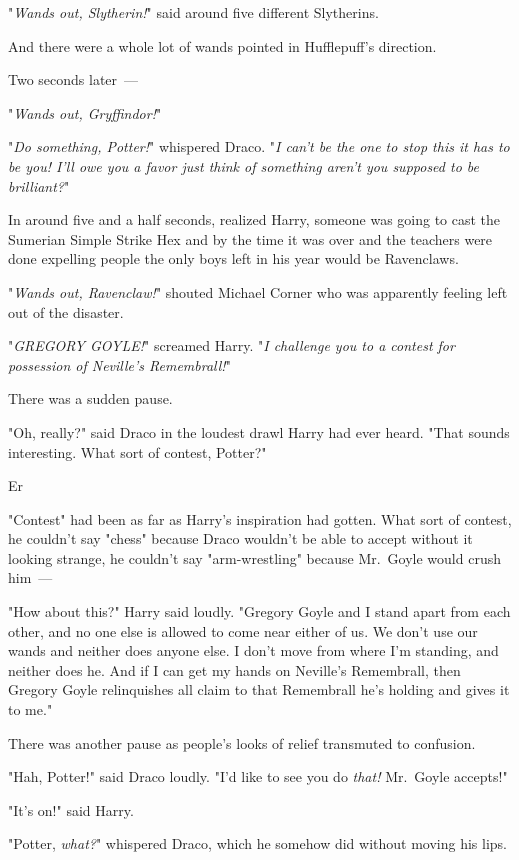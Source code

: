 "\emph{Wands out, Slytherin!}" said around five different Slytherins.

And there were a whole lot of wands pointed in Hufflepuff's direction.

Two seconds later~---

"\emph{Wands out, Gryffindor!}"

"\emph{Do something, Potter!}" whispered Draco. "\emph{I can't be the one to
stop this it has to be you! I'll owe you a favor just think of something
aren't you supposed to be brilliant?}"

In around five and a half seconds, realized Harry, someone was going to cast
the Sumerian Simple Strike Hex and by the time it was over and the teachers
were done expelling people the only boys left in his year would be Ravenclaws.

"\emph{Wands out, Ravenclaw!}" shouted Michael Corner who was apparently
feeling left out of the disaster.

"\emph{GREGORY GOYLE!}" screamed Harry. "\emph{I challenge you to a contest for
possession of Neville's Remembrall!}"

There was a sudden pause.

"Oh, really?" said Draco in the loudest drawl Harry had ever heard. "That
sounds interesting. What sort of contest, Potter?"

Er{\el}

"Contest" had been as far as Harry's inspiration had gotten. What sort of
contest, he couldn't say "chess" because Draco wouldn't be able to accept
without it looking strange, he couldn't say "arm-wrestling" because Mr.~Goyle
would crush him~---

"How about this?" Harry said loudly. "Gregory Goyle and I stand apart from each
other, and no one else is allowed to come near either of us. We don't use our
wands and neither does anyone else. I don't move from where I'm standing, and
neither does he. And if I can get my hands on Neville's Remembrall, then
Gregory Goyle relinquishes all claim to that Remembrall he's holding and gives
it to me."

There was another pause as people's looks of relief transmuted to confusion.

"Hah, Potter!" said Draco loudly. "I'd like to see you do \emph{that!}
Mr.~Goyle accepts!"

"It's on!" said Harry.

"Potter, \emph{what?}" whispered Draco, which he somehow did without moving his
lips.

